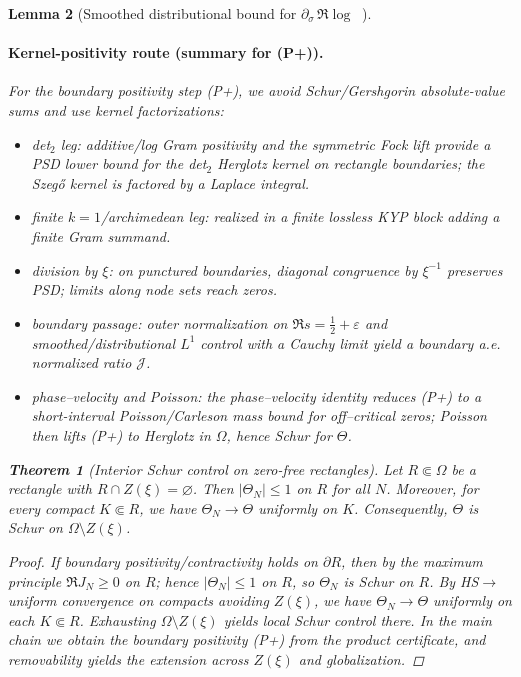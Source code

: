 \documentclass[11pt]{article}
\newtheorem{theorem}{Theorem}
\newtheorem{lemma}[theorem]{Lemma}
\theoremstyle{definition}
\theoremstyle{remark}
\DeclareMathOperator{\dettwo}{det_2}
\begin{document}
\begin{lemma}[Smoothed distributional bound for $\partial_\sigma\,\Re\log\dettwo$]
\paragraph{Kernel-positivity route (summary for (P+)).}
For the boundary positivity step (P+), we avoid Schur/Gershgorin absolute-value sums and use kernel factorizations:
\begin{itemize}
 \item det$_2$ leg: additive/log Gram positivity and the symmetric Fock lift provide a PSD lower bound for the det$_2$ Herglotz kernel on rectangle boundaries; the Szeg\H{o} kernel is factored by a Laplace integral.
 \item finite $k{=}1$/archimedean leg: realized in a finite lossless KYP block adding a finite Gram summand.
 \item division by $\xi$: on punctured boundaries, diagonal congruence by $\xi^{-1}$ preserves PSD; limits along node sets reach zeros.
 \item boundary passage: outer normalization on $\Re s=\tfrac12+\varepsilon$ and smoothed/distributional $L^1$ control with a Cauchy limit yield a boundary a.e. normalized ratio $\mathcal J$.
 \item phase–velocity and Poisson: the phase–velocity identity reduces (P+) to a short-interval Poisson/Carleson mass bound for off–critical zeros; Poisson then lifts (P+) to Herglotz in $\Omega$, hence Schur for $\Theta$.
\end{itemize}
\begin{theorem}[Interior Schur control on zero-free rectangles]\label{thm:UIC}
Let \(R\Subset\Omega\) be a rectangle with \(R\cap Z(\xi)=\varnothing\). Then \(|\Theta_N|\le 1\) on \(R\) for all \(N\). Moreover, for every compact \(K\Subset R\), we have \(\Theta_N\to\Theta\) uniformly on \(K\). Consequently, \(\Theta\) is Schur on \(\Omega\setminus Z(\xi)\).
\end{theorem}
\begin{proof}
If boundary positivity/contractivity holds on \(\partial R\), then by the maximum principle \(\Re J_N\ge0\) on \(R\); hence \(|\Theta_N|\le 1\) on \(R\), so \(\Theta_N\) is Schur on \(R\). By HS\(\to\)\(\dettwo\) uniform convergence on compacts avoiding \(Z(\xi)\), we have \(\Theta_N\to\Theta\) uniformly on each \(K\Subset R\). Exhausting \(\Omega\setminus Z(\xi)\) yields local Schur control there. In the main chain we obtain the boundary positivity (P+) from the product certificate, and removability yields the extension across \(Z(\xi)\) and globalization.
\end{proof}


\end{lemma}
\end{document}
